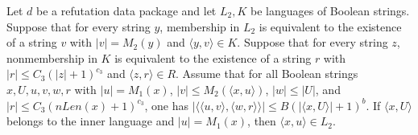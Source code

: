 \begin{theorem}
\label{Complexity.Yap.sound}
\leanok
{}
Let $d$ be a refutation data package and let $L_2,K$ be languages of Boolean strings.
Suppose that for every string $y$, membership in $L_2$ is equivalent to the existence of
a string $v$ with $|v|=M_2(y)$ and $\langle y,v\rangle\in K$. Suppose that for every
string $z$, nonmembership in $K$ is equivalent to the existence of a string $r$ with
$|r|\le C_3(|z|+1)^{c_3}$ and $\langle z,r\rangle\in R$. Assume that for all Boolean
strings $x,U,u,v,w,r$ with $|u|=M_1(x)$, $|v|\le M_2(\langle x,u\rangle)$, $|w|\le|U|$,
and $|r|\le C_3(nLen(x)+1)^{c_3}$, one has $|\langle\langle u,v\rangle,\langle
w,r\rangle\rangle|\le B(|\langle x,U\rangle|+1)^b$. If $\langle x,U\rangle$ belongs to
the inner language and $|u|=M_1(x)$, then $\langle x,u\rangle\in L_2$.
\end{theorem}

